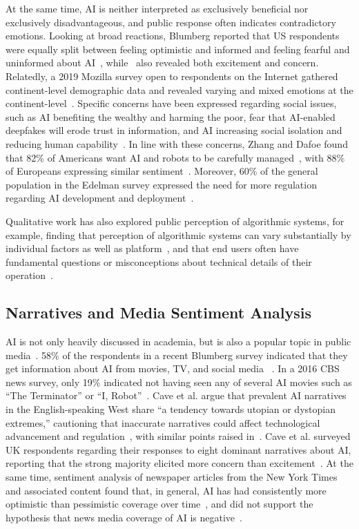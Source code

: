 \documentclass[sigconf]{acmart}
\begin{document}
At the same time, AI is neither interpreted as exclusively beneficial nor exclusively disadvantageous, and public response often indicates contradictory emotions. Looking at broad reactions, Blumberg reported that US respondents were equally split between feeling optimistic and informed and feeling fearful and uninformed about AI~\cite{blumberg2019}, while~\cite{arm2017} also revealed both excitement and concern. Relatedly, a 2019 Mozilla survey open to respondents on the Internet gathered continent-level demographic data and revealed varying and mixed emotions at the continent-level~\cite{mozilla2019}. Specific concerns have been expressed regarding social issues, such as AI benefiting the wealthy and harming the poor, fear that AI-enabled deepfakes will erode trust in information, and AI increasing social isolation and reducing human capability~\cite{edelman2019}. In line with these concerns, Zhang and Dafoe found that 82\% of Americans want AI and robots to be carefully managed~\cite{zhang2019artificial}, with 88\% of Europeans expressing similar sentiment~\cite{european2017}. Moreover, 60\% of the general population in the Edelman survey expressed the need for more regulation regarding AI development and deployment~\cite{edelman2019}.

Qualitative work has also explored public perception of algorithmic systems, for example, finding that perception of algorithmic systems can vary substantially by individual factors as well as platform~\cite{devito2017platforms}, and that end users often have fundamental questions or misconceptions about technical details of their operation~\cite{bucher2017algorithmic, eslami2015always, rader2015understanding, ur2012smart, warshaw2016intuitions}.

\subsection{Narratives and Media Sentiment Analysis}
AI is not only heavily discussed in academia, but is also a popular topic in public media~\cite{edelman2019}. 58\% of the respondents in a recent Blumberg survey indicated that they get information about AI from movies, TV, and social media ~\cite{blumberg2019}. In a 2016 CBS news survey, only 19\% indicated not having seen any of several AI movies such as ``The Terminator'' or ``I, Robot''~\cite{cbs2016}. Cave et al. argue that prevalent AI narratives in the English-speaking West share ``a tendency towards utopian or dystopian extremes,'' cautioning that inaccurate narratives could affect technological advancement and regulation~\cite{cave2018portrayals}, with similar points raised in~\cite{horvitz2012interim, stone2016artificial, you2015}. Cave et al. surveyed UK respondents regarding their responses to eight dominant narratives about AI, reporting that the strong majority elicited more concern than excitement~\cite{cave2019}. At the same time, sentiment analysis of newspaper articles from the New York Times and associated content found that, in general, AI has had consistently more optimistic than pessimistic coverage over time~\cite{fast2017long}, and did not support the hypothesis that news media coverage of AI is negative~\cite{garvey2019sentiment}.
\end{document}
